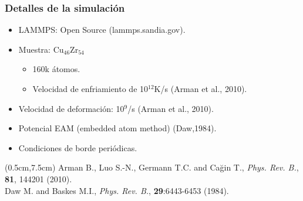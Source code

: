 \documentclass[12pt,t]{beamer}
\begin{document}
\begin{frame}
    \frametitle{Detalles de la simulaci\'on}
    \vspace{0.2cm}
    \begin{itemize}
        \item LAMMPS: Open Source (lammps.sandia.gov).
        \item Muestra: Cu$_{46}$Zr$_{54}$
        \begin{itemize}
	  \item 160k \'atomos.
	  \item Velocidad de enfriamiento de 10$^{12}$K/s (Arman et al., 2010).
        \end{itemize}
	\item Velocidad de deformaci\'on: 10$^9$/s (Arman et al., 2010).
	\item Potencial EAM (embedded atom method) (Daw,1984).
	\item Condiciones de borde peri\'odicas.
    \end{itemize}
    \begin{textblock*}{12cm}(0.5cm,7.5cm) %
        \scriptsize{Arman B., Luo S.-N., Germann T.C. and Cağin T., \textit{Phys. Rev. B.}, \textbf{81}, 144201 (2010).\\
        Daw M. and Baskes M.I., \textit{Phys. Rev. B.}, \textbf{29}:6443-6453 (1984).}
    \end{textblock*}
\end{frame}
\end{document}
